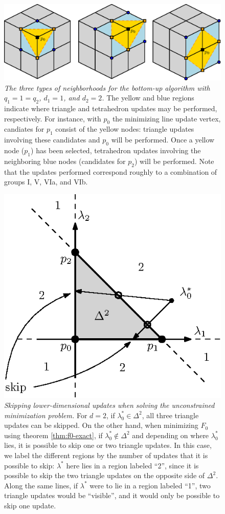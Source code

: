 \documentclass[smallcondensed]{svjour3}
\begin{document}
\begin{figure}[t]
  \centering
  \includegraphics[width=0.85\linewidth]{hu-neighborhoods.eps}
  \caption{\emph{The three types of neighborhoods for the \emph{bottom-up}
      algorithm with $q_1 = 1 = q_2$, $d_1 = 1$, and $d_2 = 2$.} The
    yellow and blue regions indicate where triangle and tetrahedron
    updates may be performed, respectively. For instance, with $p_0$
    the minimizing line update vertex, candiates for $p_1$ consist of
    the yellow nodes: triangle updates involving these candidates and
    $p_0$ will be performed. Once a yellow node ($p_1$) has been
    selected, tetrahedron updates involving the neighboring blue nodes
    (candidates for $p_2$) will be performed. Note that the updates
    performed correspond roughly to a combination of groups I, V, VIa,
    and VIb.}\label{fig:hu-neighborhoods}
\end{figure}


\begin{figure}
  \centering
  \includegraphics[width=0.4\linewidth]{skip-zones.eps}
  \caption{\emph{Skipping lower-dimensional updates when solving the
      unconstrained minimization problem.} For $d = 2$, if
    $\lambda_0^* \in \Delta^2$, all three triangle updates can be
    skipped. On the other hand, when minimizing $F_0$ using theorem
    \ref{thm:f0-exact}, if $\lambda^*_0 \notin \Delta^2$ and depending
    on where $\lambda_0^*$ lies, it is possible to skip one or two
    triangle updates. In this case, we label the different regions by
    the number of updates that it is possible to skip: $\lambda^*$
    here lies in a region labeled ``2'', since it is possible to skip
    the two triangle updates on the opposite side of $\Delta^2$. Along
    the same lines, if $\lambda^*$ were to lie in a region labeled
    ``1'', two triangle updates would be ``visible'', and it would
    only be possible to skip one update.}\label{fig:skip-zones}
\end{figure}
\end{document}
